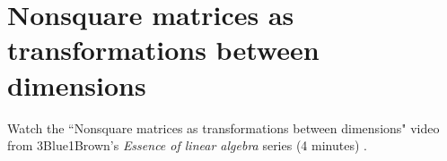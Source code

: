 \section{Nonsquare matrices as transformations between dimensions}

Watch the ``Nonsquare matrices as transformations between dimensions" video from
3Blue1Brown's \textit{Essence of linear algebra} series (4 minutes)
\cite{bib:linalg_nonsquare_matrices_as_transformations_between_dimensions}.
